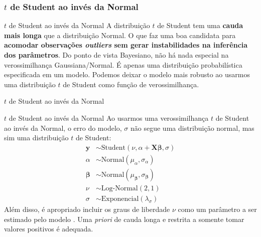 \subsubsection{$t$ de Student ao invés da Normal}
\begin{frame}{$t$ de Student ao invés da Normal}
    A distribuição $t$ de Student tem uma \textbf{cauda mais longa} que a
    distribuição Normal.
    \vfill
    O que faz uma boa candidata para \textbf{acomodar observações \textit{outliers} sem
    gerar instabilidades na inferência dos parâmetros}.
    \vfill
    Do ponto de vista Bayesiano, não há nada especial na verossimilhança
    Gaussiana/Normal. É apenas uma distribuição probabilística especificada
    em um modelo. Podemos deixar o modelo mais robusto ao usarmos uma distribuição $t$
    de Student como função de verossimilhança.
\end{frame}

\begin{frame}{$t$ de Student ao invés da Normal}
    \centering
\end{frame}

\begin{frame}{$t$ de Student ao invés da Normal}
    Ao usarmos uma verossimilhança $t$ de Student ao invés da Normal, o erro do modelo,
    $\sigma$ não segue uma distribuição normal, mas sim uma distribuição $t$ de Student:
    $$
    \begin{aligned}
        \boldsymbol{y} &\sim \text{Student}\left( \nu, \alpha + \mathbf{X} \boldsymbol{\beta}, \sigma \right) \\
        \alpha &\sim \text{Normal}(\mu_\alpha, \sigma_\alpha) \\
        \boldsymbol{\beta} &\sim \text{Normal}(\mu_{\boldsymbol{\beta}}, \sigma_{\boldsymbol{\beta}}) \\
        \nu &\sim \text{Log-Normal}(2, 1) \\
        \sigma &\sim \text{Exponencial}(\lambda_\sigma)
    \end{aligned}
    $$
    \small
    Além disso, é apropriado incluir os graus de liberdade $\nu$ como um parâmetro a
    ser estimado pelo modelo \parencite{gelman2013bayesian}. Uma \textit{priori}
    de cauda longa e restrita a somente tomar valores positivos é adequada.
\end{frame}


